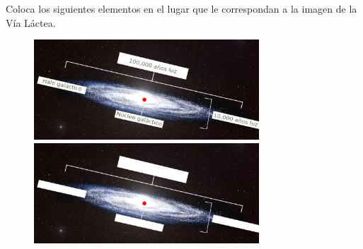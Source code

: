 Coloca los siguientes elementos en el lugar que le correspondan a la imagen de la Vía Láctea.

\begin{center}
     \quad {} \quad {} \quad {}
\end{center}
\begin{figure}[H]
    \centering
    \ifprintanswers
    \includegraphics[width=0.75\textwidth]{../images/SINFI_AC85_IMG1_oka.jpg}
    \else
    \includegraphics[width=0.75\textwidth]{../images/SINFI_AC85_IMG1_ok.jpg}
    \fi
\end{figure}

